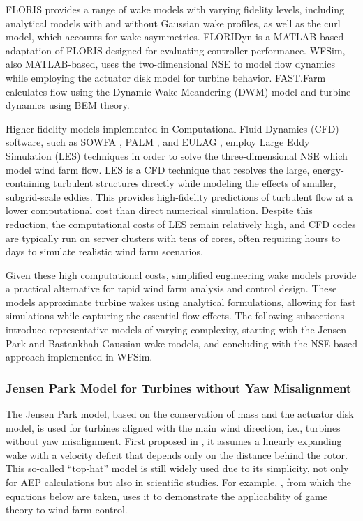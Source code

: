 FLORIS provides a range of wake models with varying fidelity levels, including analytical models with and without Gaussian wake profiles, as well as the curl model, which accounts for wake asymmetries. FLORIDyn \cite{becker2022FLORIDyn} is a MATLAB-based adaptation of FLORIS designed for evaluating controller performance. WFSim, also MATLAB-based, uses the two-dimensional NSE to model flow dynamics while employing the actuator disk model for turbine behavior. FAST.Farm \cite{jonkman2017development} calculates flow using the Dynamic Wake Meandering (DWM) model and turbine dynamics using BEM theory.

Higher-fidelity models implemented in Computational Fluid Dynamics (CFD) software, such as SOWFA \cite{fleming2014evaluating}, PALM \cite{maronga2015parallelized}, and EULAG \cite{prusa2008eulag}, employ Large Eddy Simulation (LES) techniques in order to solve the three-dimensional NSE which model wind farm flow. LES is a CFD technique that resolves the large, energy-containing turbulent structures directly while modeling the effects of smaller, subgrid-scale eddies. This provides high-fidelity predictions of turbulent flow at a lower computational cost than direct numerical simulation. Despite this reduction, the computational costs of LES remain relatively high, and CFD codes are typically run on server clusters with tens of cores, often requiring hours to days to simulate realistic wind farm scenarios.

Given these high computational costs, simplified engineering wake models provide a practical alternative for rapid wind farm analysis and control design. These models approximate turbine wakes using analytical formulations, allowing for fast simulations while capturing the essential flow effects. The following subsections introduce representative models of varying complexity, starting with the Jensen Park and Bastankhah Gaussian wake models, and concluding with the NSE-based approach implemented in WFSim.

\subsubsection{Jensen Park Model for Turbines without Yaw Misalignment} \label{subsecJensen}
The Jensen Park model, based on the conservation of mass and the actuator disk model, is used for turbines aligned with the main wind direction, i.e., turbines without yaw misalignment. First proposed in \cite{jensen1983note}, it assumes a linearly expanding wake with a velocity deficit that depends only on the distance behind the rotor. This so-called ``top-hat'' model is still widely used due to its simplicity, not only for AEP calculations but also in scientific studies. For example, \cite{barreiro2019data}, from which the equations below are taken, uses it to demonstrate the applicability of game theory to wind farm control. 

